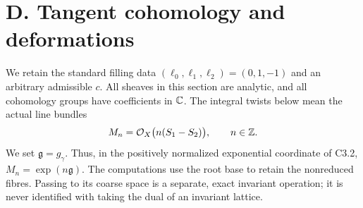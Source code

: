 \section{D. Tangent cohomology and deformations}

We retain the standard filling data $(\ell _0,\ell _1,\ell _2)=(0,1,-1)$
and an arbitrary admissible $c$. All sheaves in this section are analytic,
and all cohomology groups have coefficients in $\mathbb C$. The integral twists
below mean the actual line bundles
\[
 M_n=\mathcal O_X\bigl(n(S_1-S_2)\bigr),\qquad n\in\mathbb Z.
\]
We set $\mathfrak g=g_\gamma$. Thus, in the positively normalized
exponential coordinate of C3.2,
$M_n=\exp(n\mathfrak g)$. The computations use the root base to retain the
nonreduced fibres. Passing to its coarse space is a separate, exact
invariant operation; it is never identified with taking the dual of an
invariant lattice.

